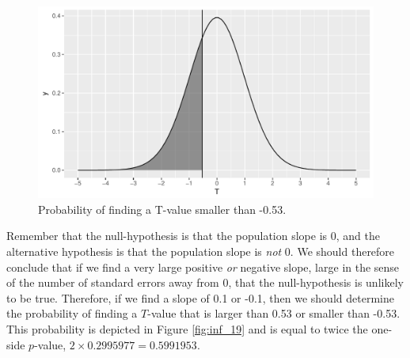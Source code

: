 \documentclass[]{report}\usepackage[]{graphicx}\usepackage[]{color}
\makeatletter
\def\maxwidth{ %
  \ifdim\Gin@nat@width>\linewidth
    \linewidth
  \else
    \Gin@nat@width
  \fi
}
\newenvironment{knitrout}{}{} %
\makeatother
\begin{document}
\begin{knitrout}
\color{fgcolor}\begin{figure}

{\centering \includegraphics[width=\maxwidth]{figure/inf_18-1} 

}

\caption[Probability of finding a T-value smaller than -0.53]{Probability of finding a T-value smaller than -0.53.}\label{fig:inf_18}
\end{figure}


\end{knitrout}

Remember that the null-hypothesis is that the population slope is 0, and the alternative hypothesis is that the population slope is \textit{not} 0. We should therefore conclude that if we find a very large positive \textit{or} negative slope, large in the sense of the number of standard errors away from 0, that the null-hypothesis is unlikely to be true. Therefore, if we find a slope of 0.1 or -0.1, then we should determine the probability of finding a $T$-value that is larger than 0.53 or smaller than -0.53. This probability is depicted in Figure \ref{fig:inf_19} and is equal to twice the one-side $p$-value, $2 \times 0.2995977=0.5991953$.
\end{document}
